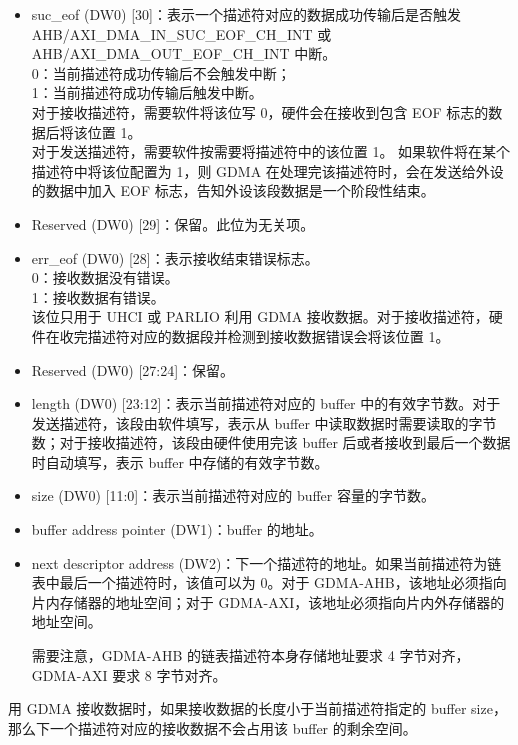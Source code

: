 \documentclass[main\_\_CN.tex]{subfiles}
\begin{document}
\begin{itemize}
    {\bfseries 注意： } 本文以 AHB/AXI\_DMA\_OUT 开头的寄存器对应 TX 通道寄存器，以 AHB/AXI\_DMA\_IN 开头的寄存器对应 RX 通道寄存器。
    \item suc\_eof (DW0) [30]：表示一个描述符对应的数据成功传输后是否触发 AHB/AXI\_DMA\_IN\_SUC\_EOF\_CH\_INT 或 AHB/AXI\_DMA\_OUT\_EOF\_CH\_INT 中断。\\
    0：当前描述符成功传输后不会触发中断；\\
    1：当前描述符成功传输后触发中断。\\
    对于接收描述符，需要软件将该位写 0，硬件会在接收到包含 EOF 标志的数据后将该位置 1。\\对于发送描述符，需要软件按需要将描述符中的该位置 1。
    如果软件将在某个描述符中将该位配置为 1，则 GDMA 在处理完该描述符时，会在发送给外设的数据中加入 EOF 标志，告知外设该段数据是一个阶段性结束。
    \item Reserved (DW0) [29]：保留。此位为无关项。
    \item err\_eof (DW0) [28]：表示接收结束错误标志。\\
    0：接收数据没有错误。\\
    1：接收数据有错误。\\
    该位只用于 UHCI 或 PARLIO 利用 GDMA 接收数据。对于接收描述符，硬件在收完描述符对应的数据段并检测到接收数据错误会将该位置 1。
    \item Reserved (DW0) [27:24]：保留。
    \item length (DW0) [23:12]：表示当前描述符对应的 buffer 中的有效字节数。对于发送描述符，该段由软件填写，表示从 buffer 中读取数据时需要读取的字节数；对于接收描述符，该段由硬件使用完该 buffer 后或者接收到最后一个数据时自动填写，表示 buffer 中存储的有效字节数。
    \item size (DW0) [11:0]：表示当前描述符对应的 buffer 容量的字节数。
    \item buffer address pointer (DW1)：buffer 的地址。
    \item next descriptor address (DW2)：下一个描述符的地址。如果当前描述符为链表中最后一个描述符时，该值可以为 0。对于 GDMA-AHB，该地址必须指向片内存储器的地址空间；对于 GDMA-AXI，该地址必须指向片内外存储器的地址空间。
    \begin{tiplisting}
        需要注意，GDMA-AHB 的链表描述符本身存储地址要求 4 字节对齐，GDMA-AXI 要求 8 字节对齐。
    \end{tiplisting}
\end{itemize}


用 GDMA 接收数据时，如果接收数据的长度小于当前描述符指定的 buffer size，那么下一个描述符对应的接收数据不会占用该 buffer 的剩余空间。
\end{document}
